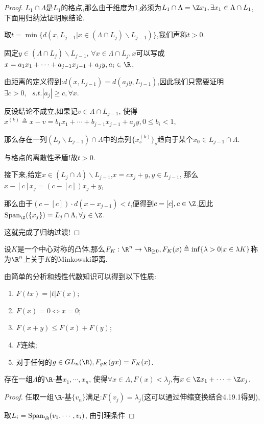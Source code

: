 \begin{proof}
    $L_1\cap \Lambda$是$L_1$的格点,那么由于维度为1,必须为$L_1\cap \Lambda = \Z x_1,\exists x_1\in \Lambda \cap L_1$,
    下面用归纳法证明原结论.

    取$t = \min\{d(x,L_{j-1} | x \in (\Lambda \cap L_j) \backslash L_{j-1})\}$,我们声称$t>0$.

    固定$y\in (\Lambda \cap L_j) \backslash L_{j-1}$,
    $\forall x\in \Lambda \cap L_j,x$可以写成$ x = a_1x_1 + \cdots + a_{j-1} x_{j-1} + a_jy, a_i\in \R$,

    由距离的定义得到:$d(x, L_{j-1}) = d(a_j y, L_{j-1})$,因此我们只需要证明$\exists c > 0, \ \ \ s.t. |a_j| \geq c,\forall x$.
    
    反设结论不成立,如果记$v\in \Lambda \cap L_{j-1}$, 使得$x^{(k)} \triangleq x-v = b_1 x_1 + \cdots + b_{j-1}x_{j-1} + a_jy, 0\leq b_i < 1$,

    那么存在一列$(L_j\backslash L_{j-1}) \cap \Lambda$中的点列$\{x_s^{(k)}\}_s$趋向于某个$x_0\in L_{j-1} \cap \Lambda$.

    与格点的离散性矛盾!故$t>0$.

    接下来,给定$x \in (L_j \cap \Lambda) \backslash L_{j-1}$,$x = cx_j + y, y \in L_{j-1}$,
    那么$x - [c]x_j = (c-[c])x_j + y$,

    那么由于$(c-[c])\cdot d(x-x_{j-1}) < t$,便得到$c = [c],c\in \Z$,因此$\mathrm{Span}_{\Z}(\{x_j\}) = L_j \cap \Lambda, \forall j\in \Z$.

    这就完成了归纳过渡!
\end{proof}
\begin{definition}[Minkowski距离]
    设$K$是一个中心对称的凸体,那么$F_K:\R^n \to \R_{\geq 0}, F_K(x) \triangleq \inf\{\lambda > 0 | x \in \lambda K\}$称为$\R^n$上关于$K$的Minkowski距离.
\end{definition}
由简单的分析和线性代数知识可以得到以下性质:
\begin{proposition}
\begin{enumerate}
    \item $F(tx) = |t|F(x)$;
    \item $F(x) = 0 \Leftrightarrow x = 0$;
    \item $F(x+y) \leq F(x) + F(y)$;
    \item $F$连续;
    \item 对于任何的$g\in GL_n(\R), F_{gK}(gx) = F_{K}(x)$.
\end{enumerate}
\end{proposition}

\begin{lemma}
    存在一组$\Lambda$的$\R$-基$x_1, \cdots, x_n$, 使得$\forall x\in \Lambda, F(x) < \lambda_j$,有$x\in \Z x_1+ \cdots  + \Z x_j$.
\end{lemma}
\begin{proof}
    任取一组$\R$-基$\{v_n\}$满足:$F(v_j) = \lambda_j$(这可以通过伸缩变换结合4.19.1得到),

    取$L_i = \mathrm{Span}_{\R} (v_1, \cdots, v_i)$,
    由引理条件 
\end{proof}